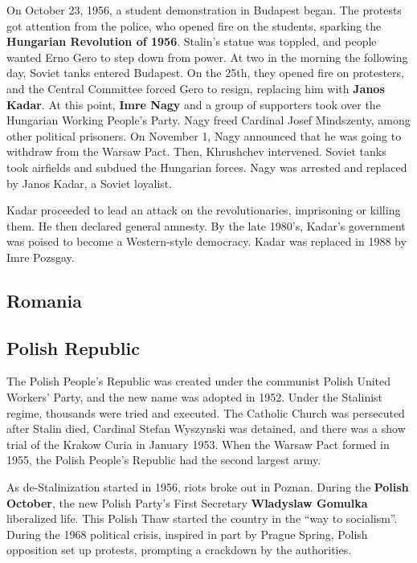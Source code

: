 On October 23, 1956, a student demonstration in Budapest began.
The protests got attention from the police, who opened fire on the students,
sparking the \textbf{Hungarian Revolution of 1956}.
Stalin's statue was toppled, and people wanted Erno Gero to step down from power.
At two in the morning the following day, Soviet tanks entered Budapest.
On the 25th, they opened fire on protesters,
and the Central Committee forced Gero to resign, replacing him with \textbf{Janos Kadar}.
At this point, \textbf{Imre Nagy} and a group of supporters took over the Hungarian Working People's Party.
Nagy freed Cardinal Josef Mindszenty, among other political prisoners.
On November 1, Nagy announced that he was going to withdraw from the Warsaw Pact.
Then, Khrushchev intervened.
Soviet tanks took airfields and subdued the Hungarian forces.
Nagy was arrested and replaced by Janos Kadar, a Soviet loyalist.

Kadar proceeded to lead an attack on the revolutionaries, imprisoning or killing them.
He then declared general amnesty.
By the late 1980's, Kadar's government was poised to become a Western-style democracy.
Kadar was replaced in 1988 by Imre Pozsgay.

\subsection*{Romania}

\subsection*{Polish Republic}

The Polish People's Republic was created under the communist Polish United Workers' Party,
and the new name was adopted in 1952.
Under the Stalinist regime, thousands were tried and executed.
The Catholic Church was persecuted after Stalin died,
Cardinal Stefan Wyszynski was detained, and there was a show trial of the Krakow Curia in January 1953.
When the Warsaw Pact formed in 1955, the Polish People's Republic had the second largest army.

As de-Stalinization started in 1956, riots broke out in Poznan.
During the \textbf{Polish October},
the new Polish Party's First Secretary \textbf{Wladyslaw Gomulka} liberalized life.
This Polish Thaw started the country in the ``way to socialism''.
During the 1968 political crisis, inspired in part by Prague Spring,
Polish opposition set up protests, prompting a crackdown by the authorities.

